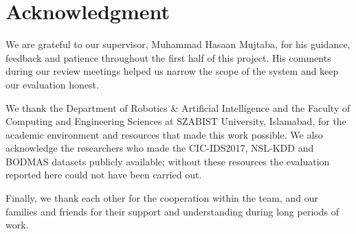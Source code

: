 \newpage
\chapter*{\centering Acknowledgment}
\par\bigskip

We are grateful to our supervisor, Muhammad Hasaan Mujtaba, for his guidance, feedback and patience throughout the first half of this project. His comments during our review meetings helped us narrow the scope of the system and keep our evaluation honest.

We thank the Department of Robotics \& Artificial Intelligence and the Faculty of Computing and Engineering Sciences at SZABIST University, Islamabad, for the academic environment and resources that made this work possible. We also acknowledge the researchers who made the CIC-IDS2017, NSL-KDD and BODMAS datasets publicly available; without these resources the evaluation reported here could not have been carried out.

Finally, we thank each other for the cooperation within the team, and our families and friends for their support and understanding during long periods of work.
